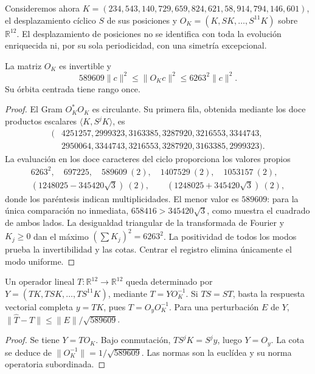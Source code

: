 Consideremos ahora \(K=(234,543,140,729,659,824,621,58,914,794,146,601)\),
el desplazamiento cíclico \(S\) de sus posiciones y
\(O_K=(K,SK,\ldots,S^{11}K)\) sobre \(\mathbb R^{12}\).
El desplazamiento de posiciones no se identifica con toda la evolución
enriquecida ni, por su sola periodicidad, con una simetría excepcional.

\begin{theorem}
\label{iv:thm:acoplamiento-orbita}
La matriz \(O_K\) es invertible y
\[
 589609\|c\|^2\leq\|O_Kc\|^2\leq6263^2\|c\|^2.
\]
Su órbita centrada tiene rango once.
\end{theorem}
\begin{proof}
El Gram \(O_K^*O_K\) es circulante. Su primera fila, obtenida mediante
los doce productos escalares \(\langle K,S^jK\rangle\), es
\[
 \begin{aligned}
 (&4251257,2999323,3163385,3287920,3216553,3344743,\\
  &2950064,3344743,3216553,3287920,3163385,2999323).
 \end{aligned}
\]
La evaluación en los doce caracteres del ciclo proporciona los valores
propios
\[
 \begin{gathered}
 6263^2,\quad697225,\quad
 589609\ (2),\quad1407529\ (2),\quad1053157\ (2),\\
 (1248025-345420\sqrt3)\ (2),\qquad
 (1248025+345420\sqrt3)\ (2),
 \end{gathered}
\]
donde los paréntesis indican multiplicidades. El menor valor es
\(589609\): para la única comparación no inmediata,
\(658416>345420\sqrt3\), como muestra el cuadrado de ambos lados.
La desigualdad triangular de la transformada de Fourier y \(K_j\geq0\)
dan el máximo \((\sum K_j)^2=6263^2\).
La positividad de todos los modos prueba la invertibilidad y las cotas.
Centrar el registro elimina únicamente el modo uniforme.
\end{proof}

\begin{corollary}
\label{iv:cor:acoplamiento-identificacion}
Un operador lineal \(T:\mathbb R^{12}\to\mathbb R^{12}\) queda determinado por
\(Y=(TK,TSK,\ldots,TS^{11}K)\), mediante \(T=YO_K^{-1}\).
Si \(TS=ST\), basta la respuesta vectorial completa \(y=TK\), pues
\(T=O_yO_K^{-1}\). Para una perturbación \(E\) de \(Y\),
\(\|\widehat T-T\|\leq\|E\|/\sqrt{589609}\).
\end{corollary}
\begin{proof}
Se tiene \(Y=TO_K\). Bajo conmutación, \(TS^jK=S^jy\), luego \(Y=O_y\).
La cota se deduce de
\(\|O_K^{-1}\|=1/\sqrt{589609}\).
Las normas son la euclídea y su norma operatoria subordinada.
\end{proof}

